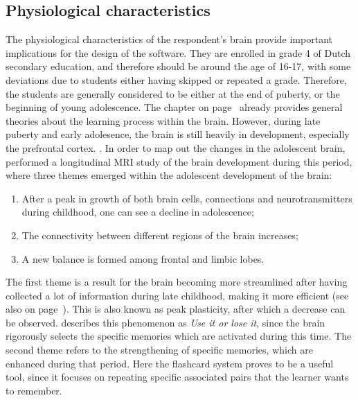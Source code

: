\subsection{Physiological characteristics}

The physiological characteristics of the respondent's brain provide important implications for the design of the software. They are enrolled in grade 4 of Dutch secondary education, and therefore should be around the age of 16-17, with some deviations due to students either having skipped or repeated a grade. Therefore, the students are generally considered to be either at the end of puberty, or the beginning of young adolescence. The  chapter on page~\pageref{ch:theory} already provides general theories about the learning process within the brain. However, during late puberty and early adolesence, the brain is still heavily in development, especially the prefrontal cortex. \cite{blakemore}. In order to map out the changes in the adolescent brain,  performed a longitudinal MRI study of the brain development during this period, where three themes emerged within the adolescent development of the brain:

\begin{enumerate}
    \item After a peak in growth of both brain cells, connections and neurotransmitters during childhood, one can see a decline in adolescence;
    \item The connectivity between different regions of the brain increases;
    \item A new balance is formed among frontal and limbic lobes.
\end{enumerate}

The first theme is a result for the brain becoming more streamlined after having collected a lot of information during late childhood, making it more efficient (see also  on page~\pageref{subsec:interferencedecay}). This is also known as peak plasticity, after which a decrease can be observed.  describes this phenomenon as \emph{Use it or lose it}, since the brain rigorously selects the specific memories which are activated during this time. The second theme refers to the strengthening of specific memories, which are enhanced during that period. Here the flashcard system proves to be a useful tool, since it focuses on repeating specific associated pairs that the learner wants to remember.

